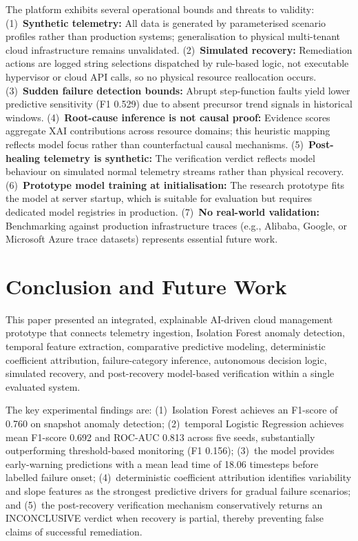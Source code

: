 \documentclass[conference]{IEEEtran}
\begin{document}
The platform exhibits several operational bounds and threats to validity: (1)~\textbf{Synthetic telemetry:} All data is generated by parameterised scenario profiles rather than production systems; generalisation to physical multi-tenant cloud infrastructure remains unvalidated. (2)~\textbf{Simulated recovery:} Remediation actions are logged string selections dispatched by rule-based logic, not executable hypervisor or cloud API calls, so no physical resource reallocation occurs. (3)~\textbf{Sudden failure detection bounds:} Abrupt step-function faults yield lower predictive sensitivity (F1 0.529) due to absent precursor trend signals in historical windows. (4)~\textbf{Root-cause inference is not causal proof:} Evidence scores aggregate XAI contributions across resource domains; this heuristic mapping reflects model focus rather than counterfactual causal mechanisms. (5)~\textbf{Post-healing telemetry is synthetic:} The verification verdict reflects model behaviour on simulated normal telemetry streams rather than physical recovery. (6)~\textbf{Prototype model training at initialisation:} The research prototype fits the model at server startup, which is suitable for evaluation but requires dedicated model registries in production. (7)~\textbf{No real-world validation:} Benchmarking against production infrastructure traces (e.g., Alibaba, Google, or Microsoft Azure trace datasets) represents essential future work.

\section{Conclusion and Future Work}

This paper presented an integrated, explainable AI-driven cloud management prototype that connects telemetry ingestion, Isolation Forest anomaly detection, temporal feature extraction, comparative predictive modeling, deterministic coefficient attribution, failure-category inference, autonomous decision logic, simulated recovery, and post-recovery model-based verification within a single evaluated system.

The key experimental findings are: (1)~Isolation Forest achieves an F1-score of 0.760 on snapshot anomaly detection; (2)~temporal Logistic Regression achieves mean F1-score 0.692 and ROC-AUC 0.813 across five seeds, substantially outperforming threshold-based monitoring (F1 0.156); (3)~the model provides early-warning predictions with a mean lead time of 18.06 timesteps before labelled failure onset; (4)~deterministic coefficient attribution identifies variability and slope features as the strongest predictive drivers for gradual failure scenarios; and (5)~the post-recovery verification mechanism conservatively returns an INCONCLUSIVE verdict when recovery is partial, thereby preventing false claims of successful remediation.
\end{document}
